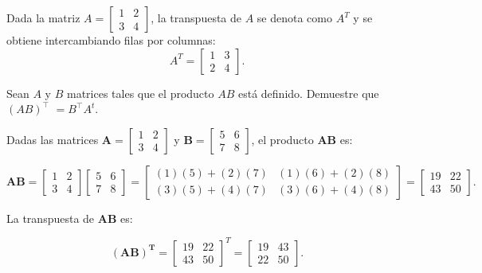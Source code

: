 \begin{example}
 Dada la matriz $A = \begin{bmatrix} 1 & 2 \\ 3 & 4 \end{bmatrix}$,
la transpuesta de $A$ se denota como $A^T$ y se obtiene intercambiando filas por columnas:
\[ A^T = \begin{bmatrix} 1 & 3 \\ 2 & 4 \end{bmatrix}. \]
\end{example}

\begin{exercise}
Sean $A$ y $B$ matrices tales que el producto $A B$ está definido. Demuestre que $(A B)^{\top}$ $=B^{\top} A^t$. 
\end{exercise}
\begin{solution}
Dadas las matrices $\mathbf{A} = \begin{bmatrix} 1 & 2 \\ 3 & 4 \end{bmatrix}$ y $\mathbf{B} = \begin{bmatrix} 5 & 6 \\ 7 & 8 \end{bmatrix}$, el producto $\boldsymbol{AB}$ es:

\[
\boldsymbol{AB} = \begin{bmatrix} 1 & 2 \\ 3 & 4 \end{bmatrix} \begin{bmatrix} 5 & 6 \\ 7 & 8 \end{bmatrix} = \begin{bmatrix} (1)(5) + (2)(7) & (1)(6) + (2)(8) \\ (3)(5) + (4)(7) & (3)(6) + (4)(8) \end{bmatrix} = \begin{bmatrix} 19 & 22 \\ 43 & 50 \end{bmatrix}.
\]

La transpuesta de $\boldsymbol{AB}$ es:

\[
\boldsymbol{(AB)^T} = \begin{bmatrix} 19 & 22 \\ 43 & 50 \end{bmatrix}^T = \begin{bmatrix} 19 & 43 \\ 22 & 50 \end{bmatrix}.
\]


\end{solution}
